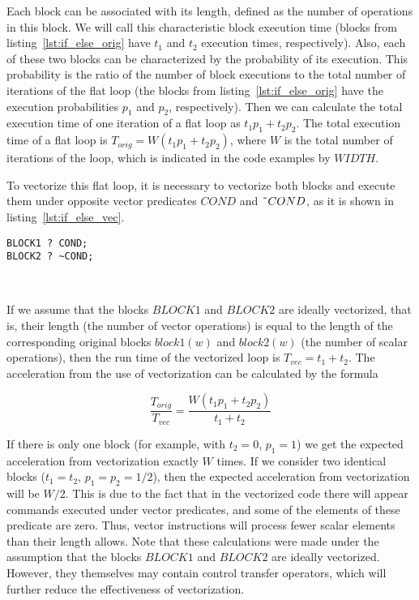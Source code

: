 \documentclass[
11pt,%
tightenlines,%
twoside,%
onecolumn,%
nofloats,%
nobibnotes,%
nofootinbib,%
superscriptaddress,%
noshowpacs,%
centertags]%
{revtex4}
\begin{document}
Each block can be associated with its length, defined as the number of operations in this block.
We will call this characteristic block execution time (blocks from listing~\ref{lst:if_else_orig} have $t_1$ and $t_2$ execution times, respectively).
Also, each of these two blocks can be characterized by the probability of its execution.
This probability is the ratio of the number of block executions to the total number of iterations of the flat loop (the blocks from listing~\ref{lst:if_else_orig} have the execution probabilities $p_1$ and $p_2$, respectively).
Then we can calculate the total execution time of one iteration of a flat loop as $t_1 p_1 + t_2 p_2$.
The total execution time of a flat loop is $T_ {orig} = W (t_1 p_1 + t_2 p_2)$, where $W$ is the total number of iterations of the loop, which is indicated in the code examples by $WIDTH$.

To vectorize this flat loop, it is necessary to vectorize both blocks and execute them under opposite vector predicates $COND$ and $\text{\~{}}COND$, as it is shown in listing~\ref{lst:if_else_vec}.

\begin{lstlisting}[caption={Vectorized construction $if-else$.},label={lst:if_else_vec}]
BLOCK1 ? COND;
BLOCK2 ? ~COND;
\end{lstlisting}

\

If we assume that the blocks $BLOCK1$ and $BLOCK2$ are ideally vectorized, that is, their length (the number of vector operations) is equal to the length of the corresponding original blocks $block1(w)$ and $block2(w)$ (the number of scalar operations), then the run time of the vectorized loop is $T_{vec} = t_1 + t_2$.
The acceleration from the use of vectorization can be calculated by the formula

\begin{equation}
\frac{T_{orig}}{T_{vec}} = \frac{W(t_1 p_1 + t_2 p_2)}{t_1 + t_2}
\end{equation}

If there is only one block (for example, with $t_2 = 0$, $p_1 = 1$) we get the expected acceleration from vectorization exactly $W$ times.
If we consider two identical blocks ($t_1 = t_2$, $p_1 = p_2 = 1/2$), then the expected acceleration from vectorization will be $W / 2$.
This is due to the fact that in the vectorized code there will appear commands executed under vector predicates, and some of the elements of these predicate are zero.
Thus, vector instructions will process fewer scalar elements than their length allows.
Note that these calculations were made under the assumption that the blocks $BLOCK1$ and $BLOCK2$ are ideally vectorized.
However, they themselves may contain control transfer operators, which will further reduce the effectiveness of vectorization.
\end{document}

